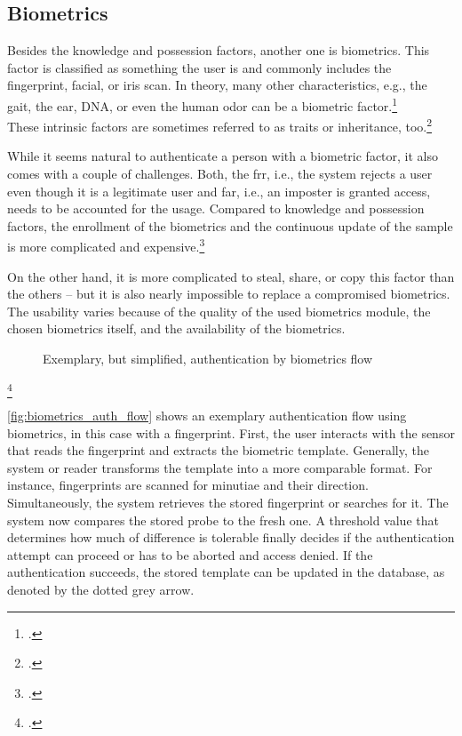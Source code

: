 \subsection{Biometrics}

Besides the knowledge and possession factors, another one is biometrics. This factor is classified as \frqq something the user is\flqq{} and commonly includes the fingerprint, facial, or iris scan. In theory, many other characteristics, e.g., the gait, the ear, DNA, or even the human odor can be a biometric factor.\footcite[See][30--34]{Jain2011}\\
These intrinsic factors are sometimes referred to as traits or inheritance, too.\footcite[See][186]{dasgupta2017multi}

While it seems natural to authenticate a person with a biometric factor, it also comes with a couple of challenges. Both, the \gls{frr}, i.e., the system rejects a user even though it is a legitimate user and \gls{far}, i.e., an imposter is granted access, needs to be accounted for the usage. Compared to knowledge and possession factors, the enrollment of the biometrics and the continuous update of the sample is more complicated and expensive.\footcites[See][18--24]{Jain2011}[See][34--37]{265831}

On the other hand, it is more complicated to steal, share, or copy this factor than the others -- but it is also nearly impossible to replace a compromised biometrics. The usability varies because of the quality of the used biometrics module, the chosen biometrics itself, and the availability of the biometrics.

\begin{figure}[hbt]
	\centering
	
	\caption[Exemplary, but simplified, authentication by biometrics flow]{Exemplary, but simplified, authentication by biometrics flow\footnotemark}
	\label{fig:biometrics_auth_flow}
\end{figure}
\footcitetext[Source: diagram by author, based on][11]{Jain2011}


\autoref{fig:biometrics_auth_flow} shows an exemplary authentication flow using biometrics, in this case with a fingerprint. First, the user interacts with the sensor that reads the fingerprint and extracts the biometric template. Generally, the system or reader transforms the template into a more comparable format. For instance, fingerprints are scanned for minutiae and their direction. Simultaneously, the system retrieves the stored fingerprint or searches for it. The system now compares the stored probe to the fresh one. A threshold value that determines how much of difference is tolerable finally decides if the authentication attempt can proceed or has to be aborted and access denied. If the authentication succeeds, the stored template can be updated in the database, as denoted by the dotted grey arrow.


